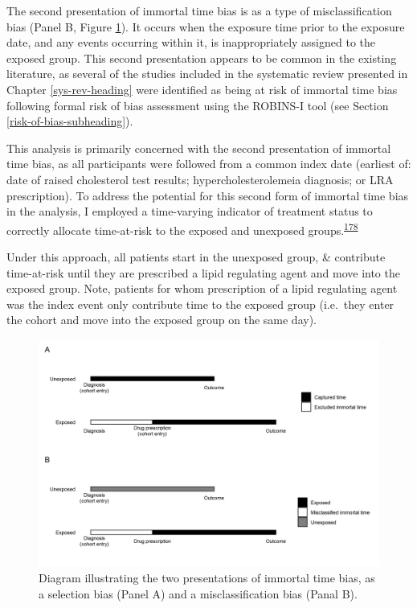 \documentclass[a4paper, twoside]{templates/ociamthesis}
\begin{document}
The second presentation of immortal time bias is as a type of misclassification bias (Panel B, Figure \ref{fig:immortalTimeBias}). It occurs when the exposure time prior to the exposure date, and any events occurring within it, is inappropriately assigned to the exposed group. This second presentation appears to be common in the existing literature, as several of the studies included in the systematic review presented in Chapter \ref{sys-rev-heading} were identified as being at risk of immortal time bias following formal risk of bias assessment using the ROBINS-I tool (see Section \ref{risk-of-bias-subheading}).

This analysis is primarily concerned with the second presentation of immortal time bias, as all participants were followed from a common index date (earliest of: date of raised cholesterol test results; hypercholesterolemeia diagnosis; or LRA prescription). To address the potential for this second form of immortal time bias in the analysis, I employed a time-varying indicator of treatment status to correctly allocate time-at-risk to the exposed and unexposed groups.\textsuperscript{\protect\hyperlink{ref-levesque2010}{178}}

Under this approach, all patients start in the unexposed group, \& contribute time-at-risk until they are prescribed a lipid regulating agent and move into the exposed group. Note, patients for whom prescription of a lipid regulating agent was the index event only contribute time to the exposed group (i.e.~they enter the cohort and move into the exposed group on the same day).





\begin{figure}[H]
\includegraphics[width=1\linewidth]{figures/cprd-analysis/immortal_time} \caption[shortcap]{Diagram illustrating the two presentations of immortal time bias, as a selection bias (Panel A) and a misclassification bias (Panal B).}\label{fig:immortalTimeBias}
\end{figure}
\end{document}
